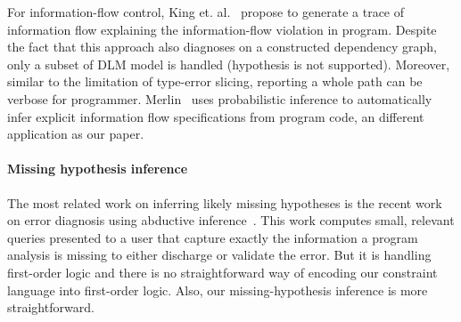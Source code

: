 For information-flow control, King et. al.~\cite{king:fse} propose to
generate a trace of information flow explaining the information-flow violation
in program. Despite the fact that this approach also diagnoses on a constructed
dependency graph, only a subset of DLM model is handled (hypothesis is not
supported). Moreover, similar to the limitation of type-error slicing,
reporting a whole path can be verbose for programmer.
Merlin~\cite{livshits:merlin} uses probabilistic inference to automatically
infer explicit information flow specifications from program code, an different
application as our paper.

\paragraph{Missing hypothesis inference}

The most related work on inferring likely missing hypotheses is the recent work
on error diagnosis using abductive inference~\cite{dillig:pldi12}. This work
computes small, relevant queries presented to a user that capture exactly the
information a program analysis is missing to either discharge or validate the
error. But it is handling first-order logic and there is no straightforward way
of encoding our constraint language into first-order logic. Also, our
missing-hypothesis inference is more straightforward.






